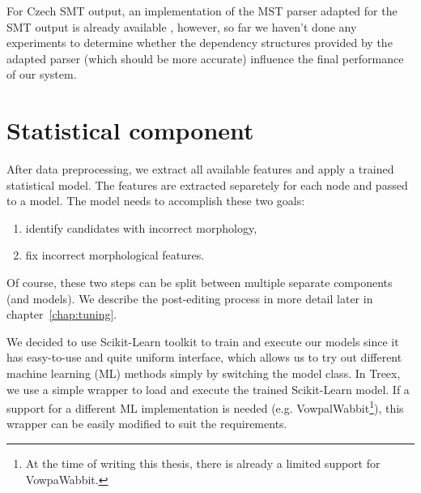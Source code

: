 For Czech SMT output, an implementation of the MST parser adapted for the SMT output
is already available \citep{biblio:RoDuUsingParallel2012}, however, so far we haven't done any experiments
to determine whether the dependency structures provided by the adapted parser (which
should be more accurate) influence the final performance of our system.



\section{Statistical component}

After data preprocessing, we extract all available features and
apply a trained statistical model. The features are extracted separetely for each node and passed
to a model. The model needs to accomplish these two goals:
\begin{enumerate}
    \item identify candidates with incorrect morphology,
    \item fix incorrect morphological features.
\end{enumerate}
Of course, these two steps can be split between multiple separate components (and models).
We describe the post-editing process in more detail later in chapter~\ref{chap:tuning}.

We decided to use Scikit-Learn \citep{scikit-learn} toolkit to train and execute our models since
it has easy-to-use and quite uniform interface, which allows us to try out different
machine learning (ML) methods simply by switching the model class. In Treex, we use a simple
wrapper to load and execute the trained Scikit-Learn model. If a support for a different ML implementation
is needed (e.g. VowpalWabbit\footnote{At the time of writing this thesis, there is already
a limited support for VowpaWabbit.}), this wrapper can be easily modified to suit the requirements.

